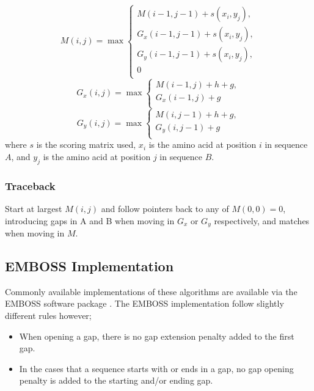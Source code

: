 \documentclass{article}
\begin{document}
\begin{equation}
M(i,j) = \max 
\begin{cases}
M(i-1,j-1) + s(x_{i}, y_{j}),\\
G_{x}(i-1,j-1) + s(x_{i}, y_{j}),\\
G_{y}(i-1,j-1) + s(x_{i}, y_{j}),\\
0\\
\end{cases}
\end{equation}
\begin{equation}
G_{x}(i,j) = \max
\begin{cases}
M(i-1,j) + h + g, \\
G_{x}(i-1,j) + g\\
\end{cases}
\end{equation}
\begin{equation}
G_{y}(i,j) = \max
\begin{cases}
M(i,j-1) + h + g, \\
G_{y}(i,j-1) + g\\
\end{cases}
\end{equation}
where $s$ is the scoring matrix used, $x_{i}$ is the amino acid at position $i$ in sequence $A$, and $y_{j}$ is the amino acid at position $j$ in sequence $B$.

\subsubsection*{Traceback}
Start at largest $M(i,j)$ and follow pointers back to any of $M(0,0) = 0$, introducing gaps in A and B when moving in $G_{x}$ or $G_{y}$ respectively, and matches when moving in $M$.

\subsection*{EMBOSS Implementation}
Commonly available implementations of these algorithms are available via the EMBOSS software package \cite{EMBOSS}. The EMBOSS implementation follow slightly different rules however;
\begin{itemize}
	\item When opening a gap, there is no gap extension penalty added to the first gap.
	\item In the cases that a sequence starts with or ends in a gap, no gap opening penalty is added to the starting and/or ending gap.
\end{itemize}
\end{document}

